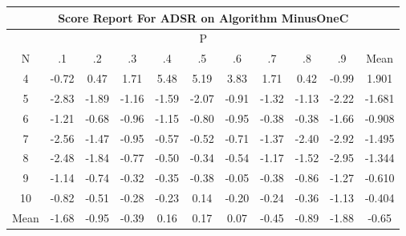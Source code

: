 \documentclass[11pt,a4paper]{report}
\begin{document}
\begin{longtable}{ | c || c | c | c | c | c | c | c | c | c || c |}
\hline
\multicolumn{11}{|c|}{ Score Report For ADSR on Algorithm MinusOneC} \\
\hline
\multicolumn{11}{|c|}{ P } \\
\hline
N & .1 & .2 & .3 & .4 & .5 & .6 & .7 & .8 & .9 & Mean\\
 \hline
 \hline
 \endhead
  4 &  \cellcolor[HTML]{FFEFEF} -0.72 &  \cellcolor[HTML]{F7F7FF} 0.47 &  \cellcolor[HTML]{D7D7FF} 1.71 &  \cellcolor[HTML]{7878FF} 5.48 &  \cellcolor[HTML]{8080FF} 5.19 &  \cellcolor[HTML]{9F9FFF} 3.83 &  \cellcolor[HTML]{D7D7FF} 1.71 &  \cellcolor[HTML]{F7F7FF} 0.42 &  \cellcolor[HTML]{FFE7E7} -0.99 & 1.901 \\
  5 &  \cellcolor[HTML]{FFB7B7} -2.83 &  \cellcolor[HTML]{FFCFCF} -1.89 &  \cellcolor[HTML]{FFDFDF} -1.16 &  \cellcolor[HTML]{FFD7D7} -1.59 &  \cellcolor[HTML]{FFC7C7} -2.07 &  \cellcolor[HTML]{FFE7E7} -0.91 &  \cellcolor[HTML]{FFDFDF} -1.32 &  \cellcolor[HTML]{FFDFDF} -1.13 &  \cellcolor[HTML]{FFC7C7} -2.22 & -1.681 \\
  6 &  \cellcolor[HTML]{FFDFDF} -1.21 &  \cellcolor[HTML]{FFEFEF} -0.68 &  \cellcolor[HTML]{FFE7E7} -0.96 &  \cellcolor[HTML]{FFDFDF} -1.15 &  \cellcolor[HTML]{FFE7E7} -0.80 &  \cellcolor[HTML]{FFE7E7} -0.95 &  \cellcolor[HTML]{FFF7F7} -0.38 &  \cellcolor[HTML]{FFF7F7} -0.38 &  \cellcolor[HTML]{FFD7D7} -1.66 & -0.908 \\
  7 &  \cellcolor[HTML]{FFBFBF} -2.56 &  \cellcolor[HTML]{FFD7D7} -1.47 &  \cellcolor[HTML]{FFE7E7} -0.95 &  \cellcolor[HTML]{FFEFEF} -0.57 &  \cellcolor[HTML]{FFEFEF} -0.52 &  \cellcolor[HTML]{FFEFEF} -0.71 &  \cellcolor[HTML]{FFDFDF} -1.37 &  \cellcolor[HTML]{FFBFBF} -2.40 &  \cellcolor[HTML]{FFB7B7} -2.92 & -1.495 \\
  8 &  \cellcolor[HTML]{FFBFBF} -2.48 &  \cellcolor[HTML]{FFCFCF} -1.84 &  \cellcolor[HTML]{FFEFEF} -0.77 &  \cellcolor[HTML]{FFEFEF} -0.50 &  \cellcolor[HTML]{FFF7F7} -0.34 &  \cellcolor[HTML]{FFEFEF} -0.54 &  \cellcolor[HTML]{FFDFDF} -1.17 &  \cellcolor[HTML]{FFD7D7} -1.52 &  \cellcolor[HTML]{FFB7B7} -2.95 & -1.344 \\
  9 &  \cellcolor[HTML]{FFDFDF} -1.14 &  \cellcolor[HTML]{FFEFEF} -0.74 &  \cellcolor[HTML]{FFF7F7} -0.32 &  \cellcolor[HTML]{FFF7F7} -0.35 &  \cellcolor[HTML]{FFF7F7} -0.38 &  \cellcolor[HTML]{FFFFFF} -0.05 &  \cellcolor[HTML]{FFF7F7} -0.38 &  \cellcolor[HTML]{FFE7E7} -0.86 &  \cellcolor[HTML]{FFDFDF} -1.27 & -0.610 \\
  10 &  \cellcolor[HTML]{FFE7E7} -0.82 &  \cellcolor[HTML]{FFEFEF} -0.51 &  \cellcolor[HTML]{FFF7F7} -0.28 &  \cellcolor[HTML]{FFF7F7} -0.23 &  \cellcolor[HTML]{FFFFFF} 0.14 &  \cellcolor[HTML]{FFF7F7} -0.20 &  \cellcolor[HTML]{FFF7F7} -0.24 &  \cellcolor[HTML]{FFF7F7} -0.36 &  \cellcolor[HTML]{FFDFDF} -1.13 & -0.404 \\
 \hline
 \hline
Mean &  \cellcolor[HTML]{FFD7D7} -1.68 &  \cellcolor[HTML]{FFE7E7} -0.95 &  \cellcolor[HTML]{FFF7F7} -0.39 &  \cellcolor[HTML]{FFFFFF} 0.16 &  \cellcolor[HTML]{F7F7FF} 0.17 &  \cellcolor[HTML]{FFFFFF} 0.07 &  \cellcolor[HTML]{FFF7F7} -0.45 &  \cellcolor[HTML]{FFE7E7} -0.89 &  \cellcolor[HTML]{FFCFCF} -1.88 &  \cellcolor[HTML]{FFEFEF} -0.65
\end{longtable}
\end{document}
